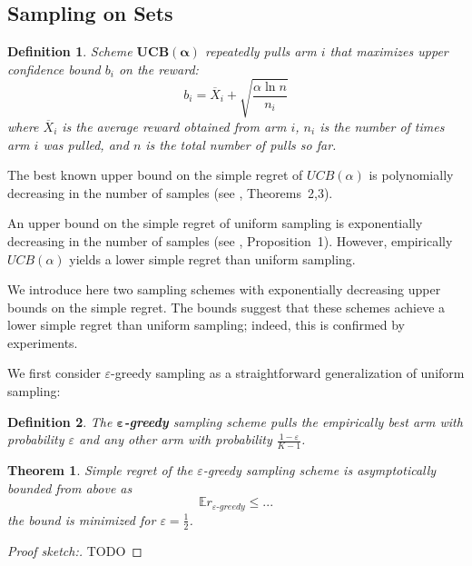 \documentclass[letterpaper]{article}
\newcommand {\IE} {\ensuremath {\mathbb{E}}}
\newtheorem{dfn}{Definition}
\newtheorem{thm}{Theorem}
\begin{document}
\subsection{Sampling on Sets}
\label{sec:sampling-on-sets}

\begin{dfn} Scheme $\mathbf{UCB(\alpha)}$ repeatedly pulls arm $i$ that maximizes 
upper confidence bound $b_i$ on the reward:
\begin{equation}
b_i=\overline X_i+\sqrt {\frac {\alpha \ln n} {n_i}}
\end{equation}
where $\overline X_i$ is the average reward obtained from arm $i$,
$n_i$ is the number of times arm $i$ was pulled, and $n$ is the total
number of pulls so far. \end{dfn} The best known upper bound on the simple
regret of $UCB(\alpha)$ is polynomially decreasing in the number of samples
(see \cite{Bubeck.pure}, Theorems~2,3).

An upper bound on the simple regret of uniform sampling is
exponentially decreasing in the number of samples (see
\cite{Bubeck.pure}, Proposition~1). However, empirically
$UCB(\alpha)$ yields a lower simple regret than uniform
sampling. 

We introduce here two sampling schemes with exponentially
decreasing upper bounds on the simple regret. The bounds
suggest that these schemes achieve a lower simple regret
than uniform sampling; indeed, this is confirmed
by experiments. 

We first consider $\varepsilon$-greedy sampling as a straightforward
generalization of uniform sampling:
\begin{dfn} The \textbf{$\mathbf{\varepsilon}$-greedy} sampling scheme
pulls the empirically best arm with probability $\varepsilon$ and any other
arm with probability $\frac {1-\varepsilon} {K-1}$. 
\end{dfn}

\begin{thm} Simple regret of the  $\varepsilon$-greedy
sampling scheme is asymptotically bounded from above as
\begin{equation}
\IE r_{\varepsilon\mbox{-}greedy}\le...
\end{equation}
the bound is minimized for $\varepsilon=\frac 1 2$.
\end{thm}

\begin{proof}[Proof sketch:] TODO
\end{proof}
\end{document}
